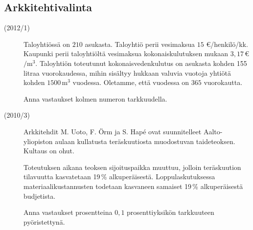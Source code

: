 \subsection*{Arkkitehtivalinta}

\begin{description}
    \item[(2012/1)] Taloyhtiössä on $210$ asukasta. Taloyhtiö perii vesimaksua
        $15$ \euro/henkilö/kk. Kaupunki perii taloyhtiöltä vesimaksua
        kokonaiskulutuksen mukaan $3,17$\,\euro $/ \mathrm{m}^3$.
        Taloyhtiön toteutunut kokonaisvedenkulutus on asukasta kohden
        155 litraa vuorokaudessa, mihin sisältyy hukkaan valuvia
        vuotoja yhtiötä kohden $1500\,\mathrm{m}^3$ vuodessa. Oletamme,
        että vuodessa on $365$ vuorokautta.
                    
    
    Anna vastaukset kolmen numeron tarkkuudella.
\end{description}


\begin{description}
    \item[(2010/3)] Arkkitehdit M. Uoto, F. Örm ja S. Hapé ovat suunnitelleet Aalto-yliopiston aulaan kullatusta teräskuutiosta muodostuvan taideteoksen. Kultaus on ohut.
    
    Toteutuksen aikana teoksen sijoituspaikka muuttuu, jolloin teräskuution tilavuutta kasvatetaan 19\,\% alkuperäisestä. Loppulaskutuksessa materiaalikustannusten todetaan kasvaneen samaiset 19\,\% alkuperäisestä budjetista.                   
    
    Anna vastaukset prosentteina $0,1$ prosenttiyksikön tarkkuuteen pyöristettynä.
\end{description}

